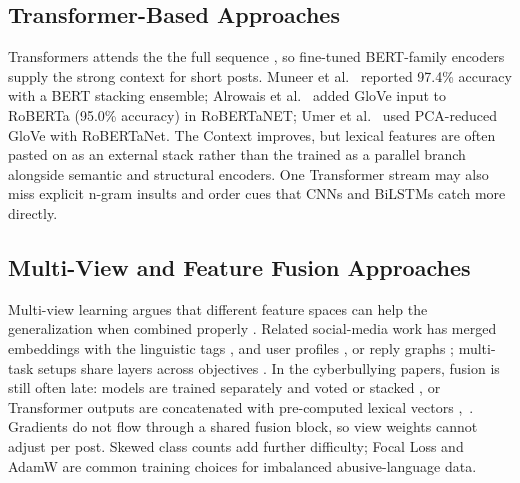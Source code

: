 \subsection{Transformer-Based Approaches}

Transformers attends the the full sequence \cite{ref9}, so fine-tuned BERT-family encoders supply the strong context for short posts. Muneer et al.\ \cite{ref14} reported 97.4\% accuracy with a BERT stacking ensemble; Alrowais et al.\ \cite{ref15} added GloVe input to RoBERTa (95.0\% accuracy) in RoBERTaNET; Umer et al.\ \cite{ref16} used PCA-reduced GloVe with RoBERTaNet. The  Context improves, but lexical features are often pasted on as an external stack rather than the trained as a parallel branch alongside semantic and structural encoders. One Transformer stream may also miss explicit n-gram insults and order cues that CNNs and BiLSTMs catch more directly.

\subsection{Multi-View and Feature Fusion Approaches}

Multi-view learning argues that different feature spaces can help the generalization when combined properly \cite{ref19}. Related social-media work has merged embeddings with the  linguistic tags \cite{ref21}, and user profiles \cite{ref22}, or reply graphs \cite{ref17}; multi-task setups share layers across objectives \cite{ref20}. In the cyberbullying papers, fusion is still often late: models are trained separately and voted or stacked \cite{ref14}, or Transformer outputs are concatenated with pre-computed lexical vectors \cite{ref15},~\cite{ref16}. Gradients do not flow through a shared fusion block, so view weights cannot adjust per post. Skewed class counts add further difficulty; Focal Loss \cite{ref23} and AdamW \cite{ref25} are common training choices for imbalanced abusive-language data.


